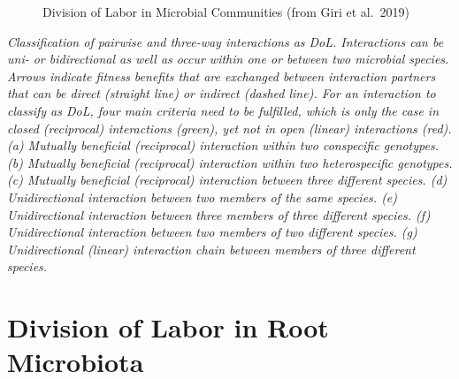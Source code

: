 \documentclass[
  11pt,
  a4paper,
]{report}
\begin{document}
\begin{figure}


\caption{\label{fig-microbial-DoL}Division of Labor in Microbial
Communities (from Giri et al.~2019)}

\end{figure}%

\emph{Classification of pairwise and three-way interactions as DoL.
Interactions can be uni- or bidirectional as well as occur within one or
between two microbial species. Arrows indicate fitness benefits that are
exchanged between interaction partners that can be direct (straight
line) or indirect (dashed line). For an interaction to classify as DoL,
four main criteria need to be fulfilled, which is only the case in
closed (reciprocal) interactions (green), yet not in open (linear)
interactions (red). (a) Mutually beneficial (reciprocal) interaction
within two conspecific genotypes. (b) Mutually beneficial (reciprocal)
interaction within two heterospecific genotypes. (c) Mutually beneficial
(reciprocal) interaction between three different species. (d)
Unidirectional interaction between two members of the same species. (e)
Unidirectional interaction between three members of three different
species. (f) Unidirectional interaction between two members of two
different species. (g) Unidirectional (linear) interaction chain between
members of three different species.}

\section{Division of Labor in Root
Microbiota}\label{division-of-labor-in-root-microbiota}
\end{document}
